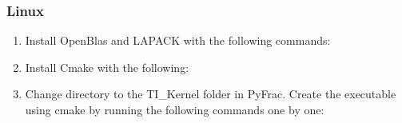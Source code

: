 \documentclass[letterpaper,10pt,english]{sphinxmanual}
\begin{document}
\subsubsection{Linux}
\label{\detokenize{GettingStarted:linux}}\begin{enumerate}
%
\item {} 
\sphinxAtStartPar
Install OpenBlas and LAPACK with the following commands:

\begin{sphinxVerbatim}[commandchars=\\\{\}]
   
   
\end{sphinxVerbatim}

\item {} 
\sphinxAtStartPar
Install Cmake with the following:

\begin{sphinxVerbatim}[commandchars=\\\{\}]
    
\end{sphinxVerbatim}

\item {} 
\sphinxAtStartPar
Change directory to the TI\_Kernel folder in PyFrac. Create the executable using cmake by running the following commands one by one:

\begin{sphinxVerbatim}[commandchars=\\\{\}]
 
\end{sphinxVerbatim}

\end{enumerate}
\end{document}
